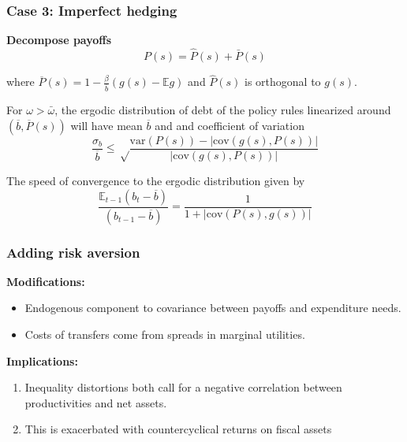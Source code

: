 \documentclass{beamer}
\newcommand{\EE}{\mathbb E}
\newcommand{\var}{\mathrm{var}}
\newcommand{\cov}{\mathrm{cov}}
\begin{document}
\begin{frame}
 \frametitle{Case 3: Imperfect hedging}

\textbf{Decompose payoffs} \[P(s)=\hat{P}(s)+\bar{P}(s)\] 

where	$\overline{P}(s) = 1- \frac{\beta}{\overline b}( g(s) - \mathbb{E} g)$ and  $\hat{P}(s)$ is orthogonal to $g(s)$. 

	

\begin{theorem}
For $\omega>\bar{\omega}$, the ergodic distribution of debt of the policy rules linearized around $(\overline b, \overline{P}(s))$ will have mean $\overline b$ and and coefficient of variation
	\[
		\frac{\sigma_b}{\overline b}\leq \sqrt\frac{\var(P(s)) - |\cov(g(s),P(s))|}{|\cov(g(s),P(s))|}
	\]

	The speed of convergence to the ergodic distribution given by
	\[
		\frac{\EE_{t-1}(b_t-\overline b)}{(b_{t-1} - \overline b)} = \frac1{1+|\cov(P(s),g(s))|}
	\]


\end{theorem}
 \end{frame}



\begin{frame}
 \frametitle{Adding risk aversion}
 
 \textbf{Modifications:}
 \begin{itemize}
  \item Endogenous component to covariance between payoffs and expenditure needs.
  
  \item Costs of transfers come from spreads in marginal utilities.
  
  
  \end{itemize}

  
 \textbf{Implications:}
  
  \begin{enumerate}
   \item Inequality distortions both call for a negative correlation between productivities and net assets. 
   \item This is exacerbated with countercyclical returns on fiscal assets

  \end{enumerate}


\end{frame}
\end{document}

